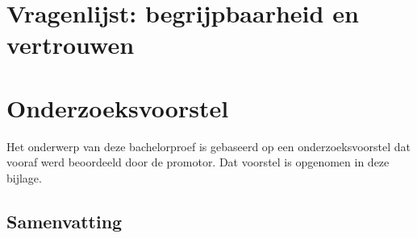 \documentclass[dutch,dit,thesis]{hogentreport}
\begin{document}





%
%







\appendix
\chapter{Vragenlijst: begrijpbaarheid en vertrouwen}
\label{app:vragenlijst-begrijpbaarheid-vertrouwen}



\chapter{Onderzoeksvoorstel}

Het onderwerp van deze bachelorproef is gebaseerd op een onderzoeksvoorstel dat vooraf werd beoordeeld door de promotor. Dat voorstel is opgenomen in deze bijlage.

\section*{Samenvatting}
\end{document}
